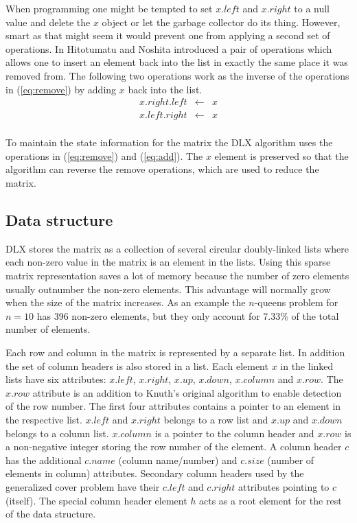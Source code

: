 When programming one might be tempted to set $x.left$ and $x.right$ to a null value and delete the $x$ object or let the garbage collector do its thing.
However, smart as that might seem it would prevent one from applying a second set of operations.
In \cite{Hitotumatu79} Hitotumatu and Noshita introduced a pair of operations which allows one to insert an element back into the list in exactly the same place it was removed from.
The following two operations work as the inverse of the operations in (\ref{eq:remove}) by adding $x$ back into the list.
\begin{equation}
	\label{eq:add}
	\begin{array}{rcl}
		x.right.left &\leftarrow& x \\
		x.left.right &\leftarrow& x \\
	\end{array}
\end{equation}

To maintain the state information for the matrix the DLX algorithm uses the operations in (\ref{eq:remove}) and (\ref{eq:add}).
The $x$ element is preserved so that the algorithm can reverse the remove operations, which are used to reduce the matrix.


\subsection{Data structure}
\label{dlx_struct}

DLX stores the matrix as a collection of several circular doubly-linked lists where each non-zero value in the matrix is an element in the lists.
Using this sparse matrix representation saves a lot of memory because the number of zero elements usually outnumber the non-zero elements.
This advantage will normally grow when the size of the matrix increases.
As an example the $n$-queens problem for $n=10$ has 396 non-zero elements, but they only account for 7.33\% of the total number of elements.

Each row and column in the matrix is represented by a separate list.
In addition the set of column headers is also stored in a list.
Each element $x$ in the linked lists have six attributes: $x.left$, $x.right$, $x.up$, $x.down$, $x.column$ and $x.row$.
The $x.row$ attribute is an addition to Knuth's original algorithm to enable detection of the row number.
The first four attributes contains a pointer to an element in the respective list.
$x.left$ and $x.right$ belongs to a row list and $x.up$ and $x.down$ belongs to a column list.
$x.column$ is a pointer to the column header and $x.row$ is a non-negative integer storing the row number of the element.
A column header $c$ has the additional $c.name$ (column name/number) and $c.size$ (number of elements in column) attributes.
Secondary column headers used by the generalized cover problem have their $c.left$ and $c.right$ attributes pointing to $c$ (itself).
The special column header element $h$ acts as a root element for the rest of the data structure.

